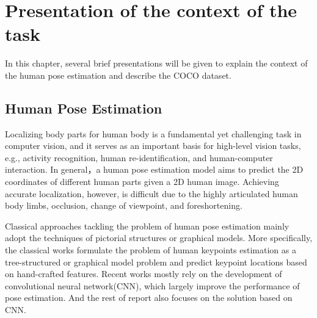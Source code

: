 \chapter{Presentation of the context of the task}
\label{sec:intro}
In this chapter, several brief presentations will be given to explain the context of the human pose estimation and describe the COCO dataset.

\section{Human Pose Estimation}
\label{sec:isauriam}
Localizing body parts for human body is a fundamental yet challenging task in computer vision, and it serves as an important basis for high-level vision tasks, e.g., activity
recognition\cite{yang2010recognizing, wang2013approach}, human re-identification\cite{zheng2017pose}, and human-computer interaction.
In general，a human pose estimation model aims to predict the 2D coordinates of different human parts given a 2D human image.
Achieving accurate localization, however, is difficult due to the highly articulated human body limbs, occlusion, change of viewpoint, and foreshortening.

Classical approaches tackling the problem of human pose estimation mainly adopt the techniques of pictorial structures \cite{fischler1973representation} or graphical models\cite{chen2014articulated}.
More specifically, the classical works\cite{andriluka2009pictorial, gkioxari2013articulated, sapp2013modec, johnson2011learning} formulate the problem of human keypoints estimation as a tree-structured or graphical model problem and predict keypoint locations based on hand-crafted features.
Recent works\cite{newell2016stacked, gkioxari2016chained, wei2016convolutional, insafutdinov2016deepercut} mostly rely on the development of convolutional neural network(CNN)\cite{lecun1998gradient, he2016deep}, which largely improve the performance of pose estimation.
And the rest of report also focuses on the solution based on CNN.

